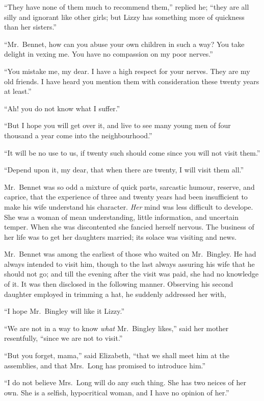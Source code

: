 “They have none of them much to recommend them,”
replied he; “they are all silly and ignorant like other
girls; but Lizzy has something more of quickness
than her sisters.”

“Mr.\ Bennet, how can you abuse your own children
in such a way? You take delight in vexing me. You
have no compassion on my poor nerves.”

“You mistake me, my dear. I have a high respect for
your nerves. They are my old friends. I have heard you
mention them with consideration these twenty years at
least.”

“Ah! you do not know what I suffer.”

“But I hope you will get over it, and live to see many
young men of four thousand a year come into the
neighbourhood.”

“It will be no use to us, if twenty such should come
since you will not visit them.”

“Depend upon it, my dear, that when there are twenty,
I will visit them all.”

Mr.\ Bennet was so odd a mixture of quick parts, sarcastic
humour, reserve, and caprice, that the experience of three
and twenty years had been insufficient to make his wife
understand his character. \textit{Her} mind was less difficult to
develope. She was a woman of mean understanding, little
information, and uncertain temper. When she was discontented
she fancied herself nervous. The business of her
life was to get her daughters married; its solace was
visiting and news.


Mr.\ Bennet was among the earliest of those who
waited on Mr.\ Bingley. He had always intended to visit
him, though to the last always assuring his wife that he
should not go; and till the evening after the visit was paid,
she had no knowledge of it. It was then disclosed in the
following manner. Observing his second daughter employed
in trimming a hat, he suddenly addressed her with,

“I hope Mr.\ Bingley will like it Lizzy.”

“We are not in a way to know \textit{what} Mr.\ Bingley likes,”
said her mother resentfully, “since we are not to visit.”

“But you forget, mama,” said Elizabeth, “that we
shall meet him at the assemblies, and that Mrs.\ Long has
promised to introduce him.”

“I do not believe Mrs.\ Long will do any such thing.
She has two neices of her own. She is a selfish, hypocritical
woman, and I have no opinion of her.”

